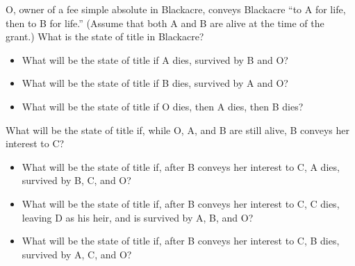 \item \label{estates-q1}
O, owner of a fee simple absolute in Blackacre, conveys Blackacre ``to A
for life, then to B for life.'' (Assume that both A and B are alive at the time
of the grant.) What is the state of title in Blackacre?

\begin{itemize}
\item What will be the state of title if A dies, survived by B and O? 
\item What will be the state of title if B dies, survived by A and O? 
\item What will be the state of title if O dies, then A dies, then B dies?
\end{itemize}


\item \label{estates-q2}
What will be the state of title if, while O, A, and B are still alive, B
conveys her interest to C?

\begin{itemize}
\item What will be the state of title if, after B conveys her interest to C, A
dies, survived by B, C, and O?
\item What will be the state of title if, after B conveys her interest to C, C
dies, leaving D as his heir, and is survived by A, B, and O?
\item What will be the state of title if, after B conveys her interest to C, B
dies, survived by A, C, and O?
\end{itemize}

